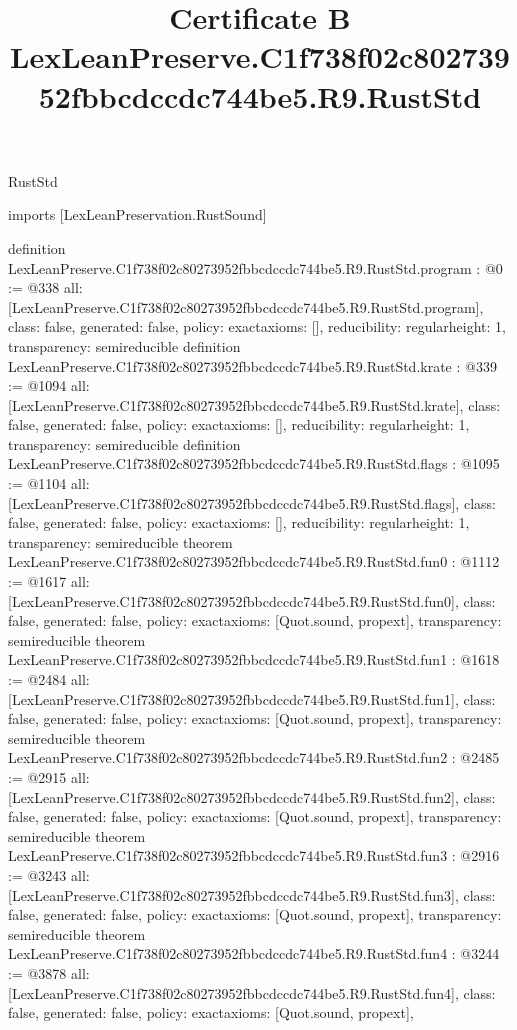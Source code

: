 \begin{lexlean}{RustStd}
\title{Certificate B LexLeanPreserve.C1f738f02c80273952fbbcdccdc744be5.R9.RustStd}
\begin{coremodule}
imports [LexLeanPreservation.RustSound]

definition LexLeanPreserve.C1f738f02c80273952fbbcdccdc744be5.R9.RustStd.program : @0 := @338 {
  all: [LexLeanPreserve.C1f738f02c80273952fbbcdccdc744be5.R9.RustStd.program],
  class: false,
  generated: false,
  policy: exact{axioms: []},
  reducibility: regular{height: 1},
  transparency: semireducible
}
definition LexLeanPreserve.C1f738f02c80273952fbbcdccdc744be5.R9.RustStd.krate : @339 := @1094 {
  all: [LexLeanPreserve.C1f738f02c80273952fbbcdccdc744be5.R9.RustStd.krate],
  class: false,
  generated: false,
  policy: exact{axioms: []},
  reducibility: regular{height: 1},
  transparency: semireducible
}
definition LexLeanPreserve.C1f738f02c80273952fbbcdccdc744be5.R9.RustStd.flags : @1095 := @1104 {
  all: [LexLeanPreserve.C1f738f02c80273952fbbcdccdc744be5.R9.RustStd.flags],
  class: false,
  generated: false,
  policy: exact{axioms: []},
  reducibility: regular{height: 1},
  transparency: semireducible
}
theorem LexLeanPreserve.C1f738f02c80273952fbbcdccdc744be5.R9.RustStd.fun0 : @1112 := @1617 {
  all: [LexLeanPreserve.C1f738f02c80273952fbbcdccdc744be5.R9.RustStd.fun0],
  class: false,
  generated: false,
  policy: exact{axioms: [Quot.sound, propext]},
  transparency: semireducible
}
theorem LexLeanPreserve.C1f738f02c80273952fbbcdccdc744be5.R9.RustStd.fun1 : @1618 := @2484 {
  all: [LexLeanPreserve.C1f738f02c80273952fbbcdccdc744be5.R9.RustStd.fun1],
  class: false,
  generated: false,
  policy: exact{axioms: [Quot.sound, propext]},
  transparency: semireducible
}
theorem LexLeanPreserve.C1f738f02c80273952fbbcdccdc744be5.R9.RustStd.fun2 : @2485 := @2915 {
  all: [LexLeanPreserve.C1f738f02c80273952fbbcdccdc744be5.R9.RustStd.fun2],
  class: false,
  generated: false,
  policy: exact{axioms: [Quot.sound, propext]},
  transparency: semireducible
}
theorem LexLeanPreserve.C1f738f02c80273952fbbcdccdc744be5.R9.RustStd.fun3 : @2916 := @3243 {
  all: [LexLeanPreserve.C1f738f02c80273952fbbcdccdc744be5.R9.RustStd.fun3],
  class: false,
  generated: false,
  policy: exact{axioms: [Quot.sound, propext]},
  transparency: semireducible
}
theorem LexLeanPreserve.C1f738f02c80273952fbbcdccdc744be5.R9.RustStd.fun4 : @3244 := @3878 {
  all: [LexLeanPreserve.C1f738f02c80273952fbbcdccdc744be5.R9.RustStd.fun4],
  class: false,
  generated: false,
  policy: exact{axioms: [Quot.sound, propext]},
}
\end{coremodule}
\end{lexlean}
